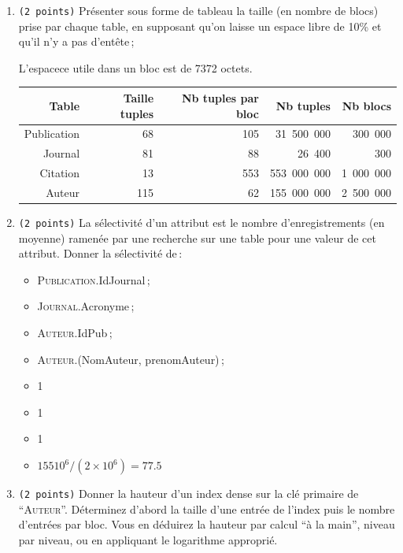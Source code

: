 \begin{enumerate}
	\item {\tt (2~points)} Présenter sous forme de tableau la taille (en nombre de
    blocs) prise par chaque table, en supposant qu'on laisse un espace
    libre de 10\% et qu'il n'y a pas d'entête\,;
\begin{solution}
	L'espacece utile dans un bloc est de 7372 octets.\\
	\begin{tabular}{rrrrr}
\textbf{Table} & {\bf Taille tuples} 	& {\bf Nb tuples par bloc} & \textbf{Nb tuples} & {\bf Nb blocs}\\
\hline
Publication&	68	&	105	&	31 500 000	&	300 000	\\
Journal&	81	&	88	&	26 400	&	300	\\
Citation&	13	&	553	&	553 000 000	&	1 000 000	\\
Auteur&	115	&	62	&	155 000 000	&	2 500 000	\\
\end{tabular}
\end{solution}

	\item {\tt (2~points)} La sélectivité d'un attribut est le nombre d'enregistrements
     (en moyenne)
     ramenée par une recherche sur une table pour une valeur de
     cet attribut.  Donner la sélectivité  de\,:
	\begin{itemize}
		\item \textsc{Publication}.IdJournal\,;
		\item \textsc{Journal}.Acronyme\,;
		\item \textsc{Auteur}.IdPub\,;
		\item \textsc{Auteur}.(NomAuteur, prenomAuteur)\,;
	\end{itemize}
\begin{solution}
\begin{itemize}
	\item 1
	\item 1
	\item 1
	\item $155 10^6 /(2\times 10^6) = 77.5$
\end{itemize}
\end{solution}

	\item {\tt (2~points)} Donner la hauteur d'un index dense sur la clé primaire de ``\textsc{Auteur}''.
    Déterminez d'abord la taille d'une entrée de l'index puis
    le nombre d'entrées par bloc.  Vous en déduirez la hauteur par
    calcul ``à la main'', niveau par niveau, ou en appliquant le logarithme
    approprié.


\end{enumerate}
